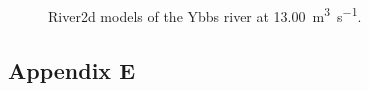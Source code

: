 \begin{figure}[h!]
\begin{tabular}{ l  c }
	\end{tabular}
	\label{fig:1300}
	
	\caption{River2d models of the Ybbs river at \SI[per-mode=symbol]{13.00}{\cubic\meter\per\second}.}   %
	
\end{figure}


\newpage                                                                %


\subsection*{Appendix E}\label{appendixE}                        %

\renewcommand\thefigure{A.\arabic{figure}}                          %
\setcounter{figure}{0}                                              %

